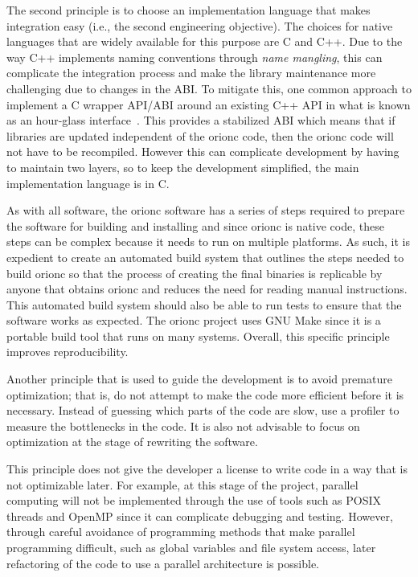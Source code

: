 The second principle is to choose an implementation language that
makes integration easy (i.e., the second engineering objective).
The choices for native languages that are widely available for
this purpose are C and C++. Due to the way C++ implements
naming conventions through \emph{name mangling}, this can
complicate the integration process and make the library
maintenance more challenging due to changes in the \acrshort{ABI}.
To mitigate this, one common approach to implement a C wrapper
\acrshort{API}/\acrshort{ABI} around an existing C++ \acrshort{API}
in what is known as an hour-glass interface~\autocite{CppCon:Hourglass:2014}.
This provides a stabilized \acrshort{ABI} which means that if
libraries are updated independent of the \gls{orionc} code, then
the \gls{orionc} code will not have to be recompiled. However this can
complicate development by having to maintain two layers, so to
keep the development simplified, the main implementation language
is in C.

As with all software, the \gls{orionc} software has a series of
steps required to prepare the software for building and
installing and since \gls{orionc} is native code, these steps can
be complex because it needs to run on multiple platforms. As such,
it is expedient to create an automated build system that outlines
the steps needed to build \gls{orionc} so that the process of
creating the final binaries is replicable by anyone that obtains
\gls{orionc} and reduces the need for reading manual instructions.
This automated build system should also be able to run tests to
ensure that the software works as expected. The \gls{orionc}
project uses GNU Make since it is a portable build tool that runs
on many systems. Overall, this specific principle improves
reproducibility.

Another principle that is used to guide the development is to
avoid premature optimization; that is, do not attempt to make the
code more efficient before it is necessary. Instead of guessing
which parts of the code are slow, use a profiler to measure the
bottlenecks in the code. It is also not advisable to focus on
optimization at the stage of rewriting the software.

This principle does not give the developer a license to write code in a way
that is not optimizable later. For example, at this stage of the project,
parallel computing will not be implemented through the use of tools such as
POSIX threads and OpenMP since it can complicate debugging and testing.
However, through careful avoidance of programming methods that make parallel
programming difficult, such as global variables and file system access, later
refactoring of the code to use a parallel architecture is possible.

